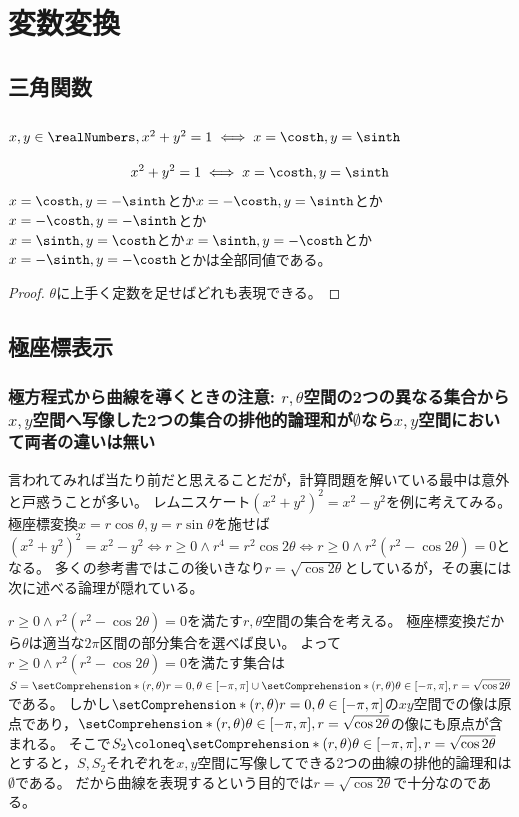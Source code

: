 \chapter{変数変換}
    \section{三角関数}
        \subsection{\texorpdfstring{$x,y\in\realNumbers,x^2+y^2=1\iff x=\costh,y=\sinth$}{2乗和が1である2実数x,yは適当なΘ∈Rを用いてx=cos(Θ), y=sin(Θ)と表せる}}
            \begin{shadebox}
                \[x^2+y^2=1\iff x=\costh,y=\sinth\]
                $x=\costh,y=-\sinth$とか$x=-\costh,y=\sinth$とか$x=-\costh,y=-\sinth$とか\\
                $x=\sinth,y=\costh$とか$x=\sinth,y=-\costh$とか$x=-\sinth,y=-\costh$とかは全部同値である。
            \end{shadebox}
            \begin{proof}
                $\theta$に上手く定数を足せばどれも表現できる。
            \end{proof}
    \section{極座標表示}
        \subsection{極方程式から曲線を導くときの注意: \texorpdfstring{$r,\theta$}{r,Θ}空間の2つの異なる集合から\texorpdfstring{$x,y$}{x,y}空間へ写像した2つの集合の排他的論理和が\texorpdfstring{$\emptyset$}{∅}なら\texorpdfstring{$x,y$}{x,y}空間において両者の違いは無い}
            言われてみれば当たり前だと思えることだが，計算問題を解いている最中は意外と戸惑うことが多い。
            レムニスケート$(x^2+y^2)^2 = x^2-y^2$を例に考えてみる。
            極座標変換$x=r\cos\theta,y=r\sin\theta$を施せば$(x^2+y^2)^2 = x^2-y^2 \iff r\geq 0\land r^4 = r^2\cos 2\theta \iff r\geq 0\land r^2(r^2-\cos 2\theta) = 0$となる。
            多くの参考書ではこの後いきなり$r = \sqrt{\cos 2\theta}$としているが，その裏には次に述べる論理が隠れている。
            \par
            $r\geq 0\land r^2(r^2-\cos 2\theta) = 0$を満たす$r,\theta$空間の集合を考える。
            極座標変換だから$\theta$は適当な$2\pi$区間の部分集合を選べば良い。
            よって$r\geq 0\land r^2(r^2-\cos 2\theta) = 0$を満たす集合は$S = \setComprehension*{(r,\theta)}{r=0, \theta \in [-\pi,\pi]} \cup \setComprehension*{(r,\theta)}{\theta \in [-\pi,\pi], r=\sqrt{\cos 2\theta}}$である。
            しかし$\setComprehension*{(r,\theta)}{r=0, \theta \in [-\pi,\pi]}$の$xy$空間での像は原点であり，$\setComprehension*{(r,\theta)}{\theta \in [-\pi,\pi], r=\sqrt{\cos 2\theta}}$の像にも原点が含まれる。
            そこで$S_2 \coloneq \setComprehension*{(r,\theta)}{\theta \in [-\pi,\pi], r=\sqrt{\cos 2\theta}}$とすると，$S,S_2$それぞれを$x,y$空間に写像してできる2つの曲線の排他的論理和は$\emptyset$である。
            だから曲線を表現するという目的では$r = \sqrt{\cos 2\theta}$で十分なのである。